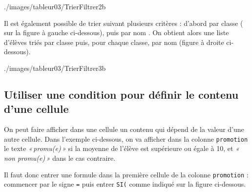 %
	      {./images/tableur03/TrierFiltrer2b}{\textwidth}

Il est également possible de trier suivant plusieurs critères : d'abord par classe ( sur la figure à gauche ci-dessous), puis par nom . On obtient alors une liste d'élèves triés par classe puis, pour chaque classe, par nom (figure à droite ci-dessous). 

%
	      {./images/tableur03/TrierFiltrer3b}{\textwidth}









 


\subsection{Utiliser une condition pour définir le contenu d'une cellule}\label{Calc3Condition}

On peut faire afficher dans une cellule un contenu qui dépend de la valeur d'une autre cellule. Dans l'exemple ci-dessous, on va afficher dans la colonne \texttt{promotion} le texte \emph{«\,promu(e)\,»} si la moyenne de l'élève est supérieure ou égale à 10, et \emph{«\,non promu(e)\,»} dans le cas contraire.


Il faut donc entrer une formule dans la première cellule de la colonne \texttt{promotion} : commencer par le signe \texttt{=} puis entrer \texttt{SI(} comme indiqué sur la figure ci-dessous.

